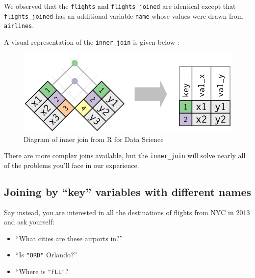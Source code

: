 \documentclass[12pt,]{krantz}
\makeatletter
\newenvironment{Shaded}{\begin{snugshade}}{\end{snugshade}}
\newcommand{\KeywordTok}[1]{\textcolor[rgb]{0.27,0.27,0.27}{\textbf{#1}}}
\newcommand{\DataTypeTok}[1]{\textcolor[rgb]{0.27,0.27,0.27}{#1}}
\newcommand{\StringTok}[1]{\textcolor[rgb]{0.5,0.5,0.5}{#1}}
\newcommand{\OperatorTok}[1]{\textcolor[rgb]{0.43,0.43,0.43}{\textbf{#1}}}
\newcommand{\NormalTok}[1]{#1}
\providecommand{\tightlist}{%
  \setlength{\itemsep}{0pt}\setlength{\parskip}{0pt}}
\newenvironment{kframe}{%
\medskip{}
\setlength{\fboxsep}{.8em}
 \def\at@end@of@kframe{}%
 \ifinner\ifhmode%
  \def\at@end@of@kframe{\end{minipage}}%
  \begin{minipage}{\columnwidth}%
 \fi\fi%
 \def\FrameCommand##1{\hskip\@totalleftmargin \hskip-\fboxsep
 \colorbox{shadecolor}{##1}\hskip-\fboxsep
     \hskip-\linewidth \hskip-\@totalleftmargin \hskip\columnwidth}%
 \MakeFramed {\advance\hsize-\width
   \@totalleftmargin\z@ \linewidth\hsize
   \@setminipage}}%
 {\par\unskip\endMakeFramed%
 \at@end@of@kframe}
\renewenvironment{Shaded}{\begin{kframe}}{\end{kframe}}
\theoremstyle{definition}
\theoremstyle{definition}
\theoremstyle{definition}
\theoremstyle{remark}
\makeatother
\begin{document}
\begin{Shaded}
\end{Shaded}

We observed that the \texttt{flights} and \texttt{flights\_joined} are
identical except that \texttt{flights\_joined} has an additional
variable \texttt{name} whose values were drawn from \texttt{airlines}.

A visual representation of the \texttt{inner\_join} is given below
\citep{rds2016}:

\begin{figure}

{\centering \includegraphics[width=\textwidth]{images/join-inner} 

}

\caption{Diagram of inner join from R for Data Science}\label{fig:ijdiagram}
\end{figure}

There are more complex joins available, but the \texttt{inner\_join}
will solve nearly all of the problems you'll face in our experience.

\subsection{\texorpdfstring{Joining by ``key'' variables with different
names}{Joining by key variables with different names}}\label{joining-by-key-variables-with-different-names}

Say instead, you are interested in all the destinations of flights from
NYC in 2013 and ask yourself:

\begin{itemize}
\tightlist
\item
  ``What cities are these airports in?''
\item
  ``Is \texttt{"ORD"} Orlando?''
\item
  ``Where is \texttt{"FLL"}?
\end{itemize}
\end{document}
